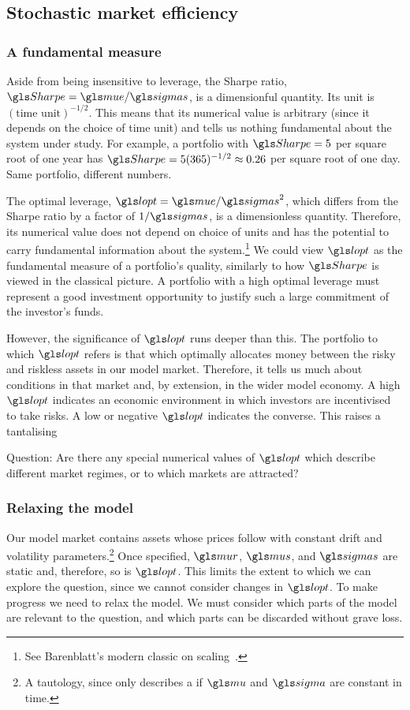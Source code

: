 \subsection{Stochastic market efficiency}

\subsubsection{A fundamental measure}
Aside from being insensitive to leverage, the Sharpe ratio, $\Sharpe=\mue/\sigmas$, is a dimensionful quantity. Its unit is $(\text{time unit})^{-1/2}$. This means that its numerical value is arbitrary (since it depends on the choice of time unit) and tells us nothing fundamental about the system under study. For example, a portfolio with $\Sharpe=5$ per square root of one year has $\Sharpe=5(365)^{-1/2}\approx0.26$ per square root of one day. Same portfolio, different numbers.

The optimal leverage, $\lopt=\mue/\sigmas^2$, which differs from the Sharpe ratio by a factor of $1/\sigmas$, is a dimensionless quantity. Therefore, its numerical value does not depend on choice of units and has the potential to carry fundamental information about the system.\footnote{See Barenblatt's modern classic on scaling~\cite{Barenblatt2003}.} We could view $\lopt$ as the fundamental measure of a portfolio's quality, similarly to how $\Sharpe$ is viewed in the classical picture. A portfolio with a high optimal leverage must represent a good investment opportunity to justify such a large commitment of the investor's funds.

However, the significance of $\lopt$ runs deeper than this. The portfolio to which $\lopt$ refers is that which optimally allocates money between the risky and riskless assets in our model market. Therefore, it tells us much about conditions in that market and, by extension, in the wider model economy. A high $\lopt$ indicates an economic environment in which investors are incentivised to take risks. A low or negative $\lopt$ indicates the converse. This raises a tantalising
\begin{keypts}{Question:}
Are there any special numerical values of $\lopt$ which describe different market regimes, or to which markets are attracted?
\end{keypts}

\subsubsection{Relaxing the model}
Our model market contains assets whose prices follow \GBM with constant drift and volatility parameters.\footnote{A tautology, since  only describes a \GBM if $\gmu$ and $\gsigma$ are constant in time.} Once specified, $\mur$, $\mus$, and $\sigmas$ are static and, therefore, so is $\lopt$. This limits the extent to which we can explore the question, since we cannot consider changes in $\lopt$. To make progress we need to relax the model. We must consider which parts of the model are relevant to the question, and which parts can be discarded without grave loss.

